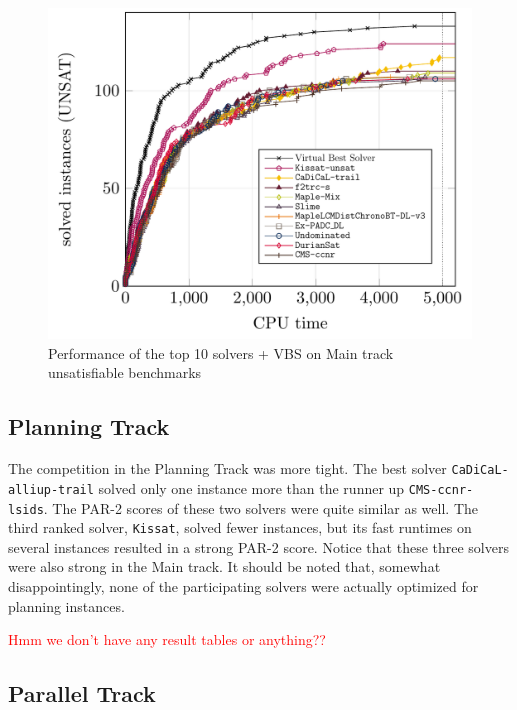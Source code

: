 \documentclass{elsarticle}
\newcommand{\solver}[1]{\texttt{#1}}
\begin{document}
\begin{figure}[ht]
\centering
\includegraphics[width=.9\textwidth]{img/paper-main-top10-UNSAT.pdf}
\caption{Performance of the top 10 solvers + VBS on Main track unsatisfiable benchmarks}
\label{main:unsat}
\end{figure}

\subsection{Planning Track}

The competition in the Planning Track was more tight. 
The best solver \solver{CaDiCaL-alliup-trail} solved only one instance more than  the runner up \solver{CMS-ccnr-lsids}. 
The PAR-2 scores of these two solvers were
quite similar as well. The third ranked solver, \solver{Kissat}, solved fewer instances, but its fast runtimes
on several instances resulted in a strong PAR-2 score. Notice that these three solvers were also strong in the Main track. 
It should be noted that, somewhat disappointingly,  none of the participating solvers were actually optimized for planning instances. 

\textcolor{red}{Hmm we don't have any result tables or anything??}

\subsection{Parallel Track}
\end{document}
